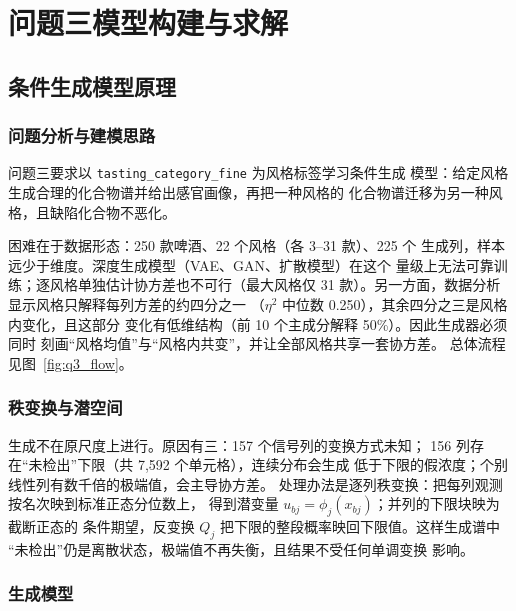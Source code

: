 \documentclass[12pt,a4paper]{article}
\begin{document}
\section{问题三模型构建与求解}

\subsection{条件生成模型原理}

\subsubsection{问题分析与建模思路}

问题三要求以 \verb|tasting_category_fine| 为风格标签学习条件生成
模型：给定风格生成合理的化合物谱并给出感官画像，再把一种风格的
化合物谱迁移为另一种风格，且缺陷化合物不恶化。

困难在于数据形态：250 款啤酒、22 个风格（各 3--31 款）、225 个
生成列，样本远少于维度。深度生成模型（VAE、GAN、扩散模型）在这个
量级上无法可靠训练；逐风格单独估计协方差也不可行（最大风格仅 31
款）。另一方面，数据分析显示风格只解释每列方差的约四分之一
（$\eta^2$ 中位数 0.250），其余四分之三是风格内变化，且这部分
变化有低维结构（前 10 个主成分解释 50\%）。因此生成器必须同时
刻画``风格均值''与``风格内共变''，并让全部风格共享一套协方差。
总体流程见图~\ref{fig:q3_flow}。


\subsubsection{秩变换与潜空间}

生成不在原尺度上进行。原因有三：157 个信号列的变换方式未知；
156 列存在``未检出''下限（共 7{,}592 个单元格），连续分布会生成
低于下限的假浓度；个别线性列有数千倍的极端值，会主导协方差。
处理办法是逐列秩变换：把每列观测按名次映到标准正态分位数上，
得到潜变量 $u_{bj}=\phi_j(x_{bj})$；并列的下限块映为截断正态的
条件期望，反变换 $Q_j$ 把下限的整段概率映回下限值。这样生成谱中
``未检出''仍是离散状态，极端值不再失衡，且结果不受任何单调变换
影响。

\subsubsection{生成模型}
\end{document}
